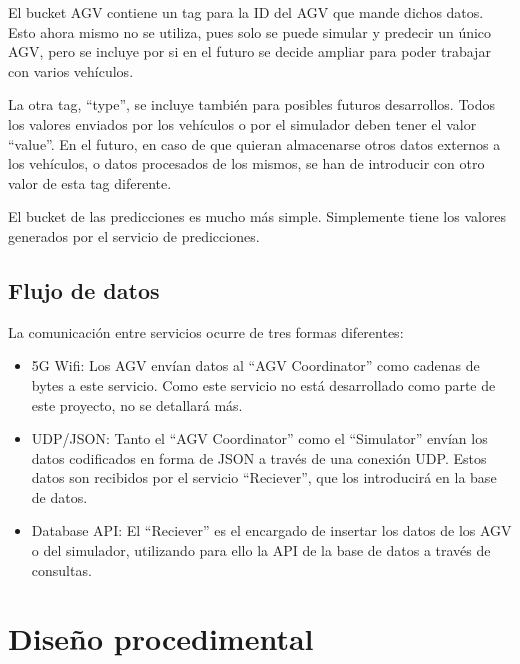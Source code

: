 El bucket AGV contiene un tag para la ID del AGV que mande dichos datos. Esto ahora mismo no se utiliza, pues 
solo se puede simular y predecir un único AGV, pero se incluye por si en el futuro se decide ampliar para poder 
trabajar con varios vehículos. 

La otra tag, ``type'', se incluye también para posibles futuros desarrollos. Todos los valores enviados por los 
vehículos o por el simulador deben tener el valor ``value''. En el futuro, en caso de que quieran almacenarse 
otros datos externos a los vehículos, o datos procesados de los mismos, se han de introducir con otro valor de 
esta tag diferente.


El bucket de las predicciones es mucho más simple. Simplemente tiene los valores generados por el servicio de 
predicciones.

\subsection{Flujo de datos}

La comunicación entre servicios ocurre de tres formas diferentes:
\begin{itemize}
    \item 5G Wifi: Los AGV envían datos al ``AGV Coordinator'' como cadenas de bytes a este servicio.
        Como este servicio no está desarrollado como parte de este proyecto, no se detallará más.
    \item UDP/JSON: Tanto el ``AGV Coordinator'' como el ``Simulator'' envían los datos codificados en 
        forma de JSON a través de una conexión UDP. Estos datos son recibidos por el servicio ``Reciever'',
        que los introducirá en la base de datos.
    \item Database API: El ``Reciever'' es el encargado de insertar los datos de los AGV o del simulador, 
        utilizando para ello la API de la base de datos a través de consultas.
\end{itemize}

\section{Diseño procedimental}

